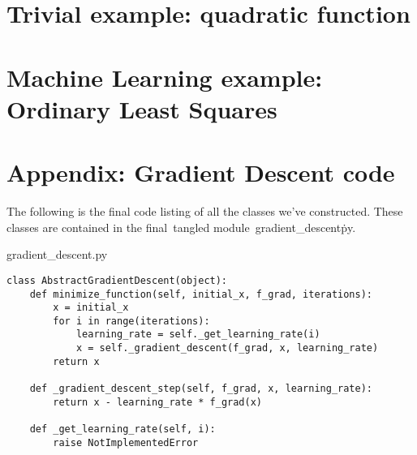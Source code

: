 \documentclass{article}
\begin{document}
\section{Trivial example: quadratic function}

\section{Machine Learning example: Ordinary Least Squares}

\section*{Appendix: Gradient Descent code}

The following is the final code listing of all the classes we've constructed.
These classes are contained in the final\, tangled module\, gradient\_descent\.py. \\

\begin{algorithm}\caption{gradient\_descent.py}\begin{lstlisting}
class AbstractGradientDescent(object):
    def minimize_function(self, initial_x, f_grad, iterations):
        x = initial_x
        for i in range(iterations):
            learning_rate = self._get_learning_rate(i)
            x = self._gradient_descent(f_grad, x, learning_rate)
        return x

    def _gradient_descent_step(self, f_grad, x, learning_rate):
        return x - learning_rate * f_grad(x)

    def _get_learning_rate(self, i):
        raise NotImplementedError
\end{lstlisting}\end{algorithm}
\end{document}
